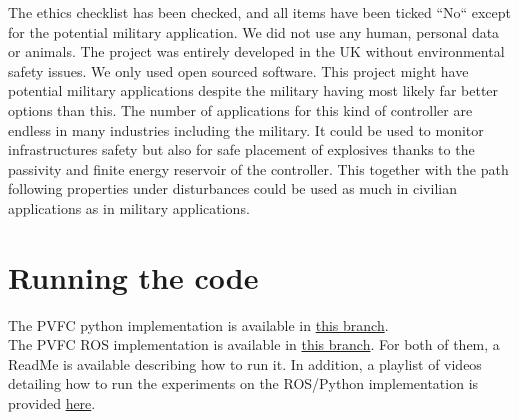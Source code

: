The ethics checklist has been checked, and all items have been ticked ``No`` except for the potential military application.
We did not use any human, personal data or animals. The project was entirely developed in the UK without environmental safety issues.
We only used open sourced software.
This project might have potential military applications despite the military having most likely far better options than this. 
The number of applications for this kind of controller are endless in many industries including the military. 
It could be used to monitor infrastructures safety but also for safe placement of explosives thanks to the passivity and finite energy reservoir of the controller. This together with the path following properties under disturbances could be used as much in civilian applications as in military applications.

\section{Running the code}
The PVFC python implementation is available in \href{https://github.com/bsbretly/pvfc_sim/tree/devel-beta_error}{this branch}.\\
The PVFC ROS implementation is available in \href{https://github.com/bsbretly/pvfc_ws/tree/jonas-pcl}{this branch}.
For both of them, a ReadMe is available describing how to run it. 
In addition, a playlist of videos detailing how to run the experiments on the ROS/Python implementation is provided \href{https://www.youtube.com/watch?v=tSBsaKx5Zww&list=PLvZGCthLI9WrbS7W-F28ljQfRyHxxw-9p}{here}.